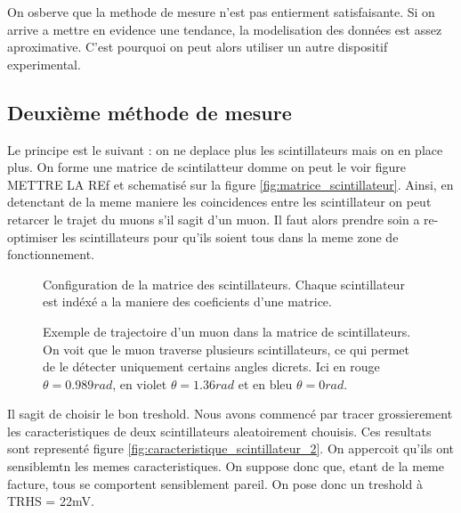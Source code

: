 \documentclass[a4paper,12pt,twoside]{article}
\begin{document}
On osberve que la methode de mesure n'est pas entierment satisfaisante. Si on arrive a mettre en evidence une tendance, la modelisation des données est assez aproximative. C'est pourquoi on peut alors utiliser un autre dispositif experimental.

\subsection{Deuxième méthode de mesure}


\begin{figure}
  
\end{figure}
Le principe est le suivant : on ne deplace plus les scintillateurs mais on en place plus. On forme une matrice de scintilatteur domme on peut le voir figure METTRE LA REf et schematisé sur la figure \ref{fig:matrice_scintillateur}.
Ainsi, en detenctant de la meme maniere les coincidences entre les scintillateur on peut retarcer le trajet du muons s'il sagit d'un muon. 
Il faut alors prendre soin a re-optimiser les scintillateurs pour qu'ils soient tous dans la meme zone de fonctionnement.
\begin{figure}[H]
  \begin{minipage}
  {0.45\textwidth}
    \centering
    
    \caption{Configuration de la matrice des scintillateurs. Chaque scintillateur est indéxé a la maniere des coeficients d'une matrice.}
    \label{fig:matrice_scintillateur}
  \end{minipage}
  \hfill
  \begin{minipage}{0.45\textwidth}
    \centering
    
    \caption{Exemple de trajectoire d'un muon dans la matrice de scintillateurs.\\On voit que le muon traverse plusieurs scintillateurs, ce qui permet de le détecter uniquement certains angles dicrets. Ici en rouge $\theta = 0.989 rad$, en violet $\theta = 1.36 rad$ et en bleu $\theta = 0 rad$.}
    \label{fig:matrice_scintillateur_2}
  \end{minipage}
\end{figure}

Il sagit de choisir le bon treshold. Nous avons commencé par tracer grossierement les caracteristiques de deux scintillateurs aleatoirement chouisis. Ces resultats sont representé figure \ref{fig:caracteristique_scintillateur_2}.
 On appercoit qu'ils ont sensiblemtn les memes caracteristiques. On suppose donc que, etant de la meme facture, tous se comportent sensiblement pareil. On pose donc un treshold à TRHS = 22mV.
\end{document}
